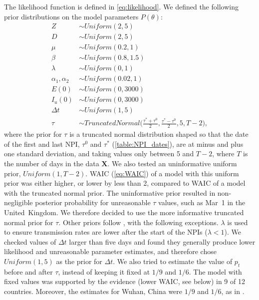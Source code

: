 \documentclass[12pt]{extarticle}
\let\vec\mathbf
\begin{document}
{The likelihood function is defined in \autoref{eq:likelihood}.
We defined the following prior distributions on the model parameters $P(\theta)$: 
\begin{equation} \label{eq:priors}
\begin{aligned} 
Z & \sim \mathit{Uniform}(2, 5) \\
D & \sim \mathit{Uniform}(2, 5) \\
\mu & \sim \mathit{Uniform}(0.2, 1) \\
\beta & \sim \mathit{Uniform}(0.8, 1.5) \\
\lambda & \sim \mathit{Uniform}(0, 1) \\
\alpha_1, \alpha_2 & \sim \mathit{Uniform}(0.02, 1)\\
E(0) & \sim \mathit{Uniform}(0, 3000) \\
I_u(0) & \sim \mathit{Uniform}(0, 3000) \\
\Delta t & \sim \mathit{Uniform}(1, 5) \\
\tau &\sim \mathit{TruncatedNormal}\Big(\frac{\tau^*+\tau^0}{2}, \frac{\tau^*-\tau^0}{2}, 5, T-2\Big),
\end{aligned}
\end{equation}
where the prior for $\tau$ is a truncated normal distribution shaped so that the date of the first and last NPI, $\tau^0$ and $\tau^*$ (\autoref{table:NPI_dates}), are at minus and plus one standard deviation, and taking values only between 5 and  $T-2$, where $T$ is the number of days in the data $\vec{X}$.
We also tested an uninformative uniform prior, $\mathit{Uniform}(1,T-2)$.
WAIC (\autoref{eq:WAIC}) of a model with this uniform prior was either higher, or lower by less than 2, compared to WAIC of a model with the truncated normal prior.
The uninformative prior resulted in non-negligible posterior probability for unreasonable $\tau$ values, such as Mar~1 in the United~Kingdom. 
We therefore decided to use the more informative truncated normal prior for $\tau$.
Other priors follow \citet{Li2020}, with the following exceptions.
$\lambda$ is used to ensure transmission rates are lower after the start of the NPIs ($\lambda < 1$).
We checked values of $\Delta t$ larger than five days and found they generally produce lower likelihood and unreasonable parameter estimates, and therefore chose $\mathit{Uniform}(1,5)$ as the prior for $\Delta t$.
We also tried to estimate the value of $p_t$ before and after $\tau$, instead of keeping it fixed at $1/9$ and $1/6$. The model with fixed values was supported by the evidence (lower WAIC, see below) in 9 of 12 countries. Moreover, the estimates for Wuhan, China were $1/9$ and $1/6$, as in \citet{Li2020}. 

}
\end{document}

